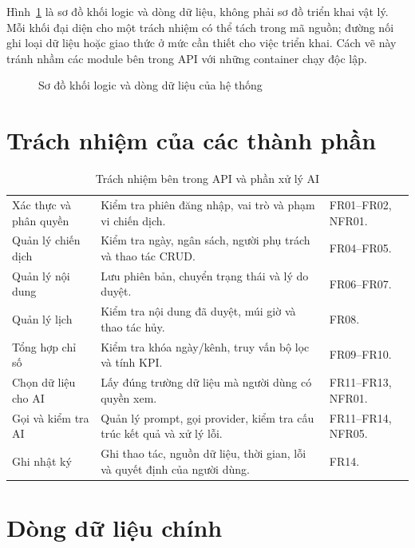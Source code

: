 Hình~\ref{fig:v8-container} là sơ đồ khối logic và dòng dữ liệu, không phải sơ đồ triển khai vật lý. Mỗi khối đại diện cho một trách nhiệm có thể tách trong mã nguồn; đường nối ghi loại dữ liệu hoặc giao thức ở mức cần thiết cho việc triển khai. Cách vẽ này tránh nhầm các module bên trong API với những container chạy độc lập.

\begin{figure}[H]
\centering

\caption{Sơ đồ khối logic và dòng dữ liệu của hệ thống}
\label{fig:v8-container}
\end{figure}

\section{Trách nhiệm của các thành phần}

\begin{table}[h!]
\centering
\small
\caption{Trách nhiệm bên trong API và phần xử lý AI}
\label{tab:v8-components}
\begin{tabularx}{\textwidth}{|L{3.4cm}|Y|L{3.2cm}|}
\hline
{} &  & \\
\hline
Xác thực và phân quyền & Kiểm tra phiên đăng nhập, vai trò và phạm vi chiến dịch. & FR01--FR02, NFR01.\\
\hline
Quản lý chiến dịch & Kiểm tra ngày, ngân sách, người phụ trách và thao tác CRUD. & FR04--FR05.\\
\hline
Quản lý nội dung & Lưu phiên bản, chuyển trạng thái và lý do duyệt. & FR06--FR07.\\
\hline
Quản lý lịch & Kiểm tra nội dung đã duyệt, múi giờ và thao tác hủy. & FR08.\\
\hline
Tổng hợp chỉ số & Kiểm tra khóa ngày/kênh, truy vấn bộ lọc và tính KPI. & FR09--FR10.\\
\hline
Chọn dữ liệu cho AI & Lấy đúng trường dữ liệu mà người dùng có quyền xem. & FR11--FR13, NFR01.\\
\hline
Gọi và kiểm tra AI & Quản lý prompt, gọi provider, kiểm tra cấu trúc kết quả và xử lý lỗi. & FR11--FR14, NFR05.\\
\hline
Ghi nhật ký & Ghi thao tác, nguồn dữ liệu, thời gian, lỗi và quyết định của người dùng. & FR14.\\
\hline
\end{tabularx}
\end{table}

\section{Dòng dữ liệu chính}

